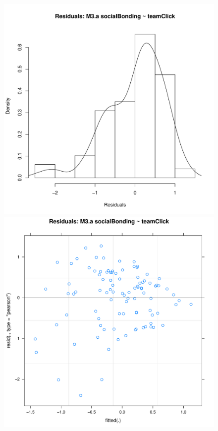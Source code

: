 \documentclass[12pt]{report}
\begin{document}
{\begin{figure}[htbp]
  \includegraphics[scale =.4]{../images/MLM3aHist.pdf}
  \includegraphics[scale =.4]{../images/MLM3aScatter.pdf}

\end{figure}}
\end{document}
